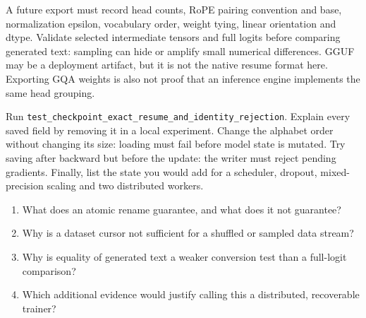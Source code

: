 A future export must record head counts, RoPE pairing convention and base,
normalization epsilon, vocabulary order, weight tying, linear orientation and
dtype. Validate selected intermediate tensors and full logits before comparing
generated text: sampling can hide or amplify small numerical differences.
GGUF may be a deployment artifact, but it is not the native resume format here.
Exporting GQA weights is also not proof that an inference engine implements
the same head grouping.

Run \texttt{test\_checkpoint\_exact\_resume\_and\_identity\_rejection}.
Explain every saved field by removing it in a local experiment. Change the
alphabet order without changing its size: loading must fail before model state
is mutated. Try saving after backward but before the update: the writer must
reject pending gradients. Finally, list the state you would add for a scheduler,
dropout, mixed-precision scaling and two distributed workers.

\checkpoint
\begin{enumerate}
\item What does an atomic rename guarantee, and what does it not guarantee?
\item Why is a dataset cursor not sufficient for a shuffled or sampled data stream?
\item Why is equality of generated text a weaker conversion test than a full-logit comparison?
\item Which additional evidence would justify calling this a distributed, recoverable trainer?
\end{enumerate}
